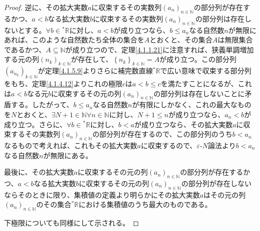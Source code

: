 \documentclass[dvipdfmx]{jsarticle}
\begin{document}
\begin{proof}
逆に、その拡大実数$a$に収束するその実数列$\left( a_{n} \right)_{n \in \mathbb{N}}$の部分列が存在するかつ、$a < b$なる拡大実数$b$に収束するその実数列$\left( a_{n} \right)_{n \in \mathbb{N}}$の部分列は存在しないとする。$\forall b \in{}^{*}\mathbb{R}$に対し、$a < b$が成り立つなら、$b \leq a_{n}$なる自然数$n$が無限にあれば、このような自然数たち全体の集合を$A$とおくと、その集合$A$は無限集合であるかつ、$A \subseteq \mathbb{N}$が成り立つので、定理\ref{4.1.1.21}に注意すれば、狭義単調増加する元の列$\left( n_{k} \right)_{k \in \mathbb{N}}$が存在して、$\left\{ n_{k} \right\}_{k \in \mathbb{N}} = A$が成り立つ。この部分列$\left( a_{n_{k}} \right)_{k \in \mathbb{N}}$が定理\ref{4.1.5.9}よりさらに補完数直線${}^{*}\mathbb{R}$で広い意味で収束する部分列をもち、定理\ref{4.1.4.12}よりこれの極限$c$は$a < b \leq c$を満たすことになるが、これは$a < b$なる元$b$に収束するその元の列$\left( a_{n} \right)_{n \in \mathbb{N}}$の部分列は存在しないことに矛盾する。したがって、$b \leq a_{n}$なる自然数$n$が有限にしかなく、これの最大なものを$N$とおくと、$\exists N + 1 \in \mathbb{N}\forall n \in \mathbb{N}$に対し、$N + 1 \leq n$が成り立つなら、$a_{n} < b$が成り立つ。さらに、$\forall b \in{}^{*}\mathbb{R}$に対し、$b < a$が成り立つなら、その拡大実数$a$に収束するその実数列$\left( a_{n} \right)_{n \in \mathbb{N}}$の部分列が存在するので、この部分列のうち$b < a_{n}$なるもので考えれば、これもその拡大実数$a$に収束するので、$\varepsilon$-$N$論法より$b < a_{n}$なる自然数$n$が無限にある。\par
最後に、その拡大実数$a$に収束するその元の列$\left( a_{n} \right)_{n \in \mathbb{N}}$の部分列が存在するかつ、$a < b$なる拡大実数$b$に収束するその元の列$\left( a_{n} \right)_{n \in \mathbb{N}}$の部分列が存在しないならそのときに限り、集積値の定義より明らかにその拡大実数$a$はその元の列$\left( a_{n} \right)_{n \in \mathbb{N}}$のその集合${}^{*}\mathbb{R}$における集積値のうち最大のものである。\par
下極限についても同様にして示される。
\end{proof}
\end{document}
